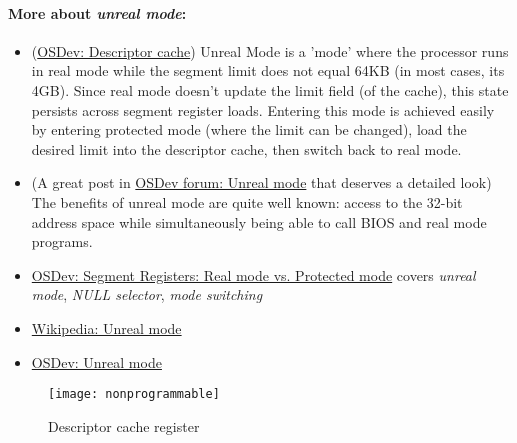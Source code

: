 \paragraph{More about \emph{unreal mode}:}
\begin{itemize}
\item (\href{http://wiki.osdev.org/Descriptor_Cache}{OSDev: Descriptor cache}) Unreal Mode
  is a 'mode' where the processor runs in real mode while the segment limit does not equal
  64KB (in most cases, its 4GB). Since real mode doesn't update the limit field (of the
  cache), this state persists across segment register loads. Entering this mode is
  achieved easily by entering protected mode (where the limit can be changed), load the
  desired limit into the descriptor cache, then switch back to real mode.
\item (A great post in
  \href{http://forum.osdev.org/viewtopic.php?f=1&t=21179&start=15}{OSDev forum: Unreal
    mode} that deserves a detailed look) The benefits of unreal mode are quite well known:
  access to the 32-bit address space while simultaneously being able to call BIOS and real
  mode programs.
\item \href{http://files.osdev.org/mirrors/geezer/johnfine/segments.htm}{OSDev: Segment
    Registers: Real mode vs. Protected mode} covers \emph{unreal mode}, \emph{NULL
    selector}, \emph{mode switching}
\item \href{http://en.wikipedia.org/wiki/Unreal_mode}{Wikipedia: Unreal mode}
\item \href{http://wiki.osdev.org/Unreal_Mode}{OSDev: Unreal mode}
\end{itemize}

\begin{figure}[h]
  \centering
  \texttt{[image: nonprogrammable]}
  \caption{Descriptor cache register}
  \label{fig:cache-register}
\end{figure}

